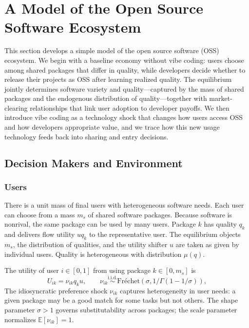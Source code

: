 \documentclass[11pt,a4paper]{article}
\theoremstyle{definition}
\theoremstyle{remark}
\begin{document}
\section{A Model of the Open Source Software
Ecosystem}\label{a-model-of-the-open-source-software-ecosystem}

This section develops a simple model of the open source software (OSS)
ecosystem. We begin with a baseline economy without vibe coding: users
choose among shared packages that differ in quality, while developers
decide whether to release their projects as OSS after learning realized
quality. The equilibrium jointly determines software variety and
quality---captured by the mass of shared packages and the endogenous
distribution of quality---together with market-clearing relationships
that link user adoption to developer payoffs. We then introduce vibe
coding as a technology shock that changes how users access OSS and how
developers appropriate value, and we trace how this new usage technology
feeds back into sharing and entry decisions. 

\subsection{Decision Makers and Environment}
\subsubsection{Users} There is a unit mass of final users with
heterogeneous software needs. Each user can choose from a mass \(m_s\)
of shared software packages. Because software is nonrival, the same
package can be used by many users. Package \(k\) has quality \(q_k\) and
delivers flow utility \(u q_k\) to the representative user. The
equilibrium objects \(m_s\), the distribution of qualities, and the
utility shifter \(u\) are taken as given by individual users. Quality is
heterogeneous with distribution \(\mu(q)\).

The utility of user \(i\in[0,1]\) from using package \(k\in[0,m_s]\) is
\begin{equation}
U_{ik} = \nu_{ik} q_k u, \qquad \nu_{ik} \stackrel{\text{i.i.d.}}{\sim} \text{Fr\'{e}chet}\left(\sigma, 1/\Gamma(1-1/\sigma)\right), \label{eq:outer-frechet}
\end{equation} The idiosyncratic preference shock \(\nu_{ik}\) captures
heterogeneity in user needs: a given package may be a good match for some tasks but not others. The shape parameter \(\sigma > 1\)
governs substitutability across packages; the scale
parameter normalizes \(\mathbb{E}[\nu_{ik}] = 1\).
\end{document}
